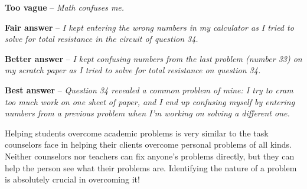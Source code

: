 \vskip 10pt {\narrower \noindent \baselineskip5pt

{\bf Too vague} -- {\it Math confuses me.}

\par} \vskip 10pt



\vskip 10pt {\narrower \noindent \baselineskip5pt

{\bf Fair answer} -- {\it I kept entering the wrong numbers in my calculator as I tried to solve for total resistance in the circuit of question 34.}

\par} \vskip 10pt



\vskip 10pt {\narrower \noindent \baselineskip5pt

{\bf Better answer} -- {\it I kept confusing numbers from the last problem (number 33) on my scratch paper as I tried to solve for total resistance on question 34.}

\par} \vskip 10pt



\vskip 10pt {\narrower \noindent \baselineskip5pt

{\bf Best answer} -- {\it Question 34 revealed a common problem of mine: I try to cram too much work on one sheet of paper, and I end up confusing myself by entering numbers from a previous problem when I'm working on solving a different one.}

\par} \vskip 10pt








Helping students overcome academic problems is very similar to the task counselors face in helping their clients overcome personal problems of all kinds.  Neither counselors nor teachers can fix anyone's problems directly, but they can help the person see what their problems are.  Identifying the nature of a problem is absolutely crucial in overcoming it!




